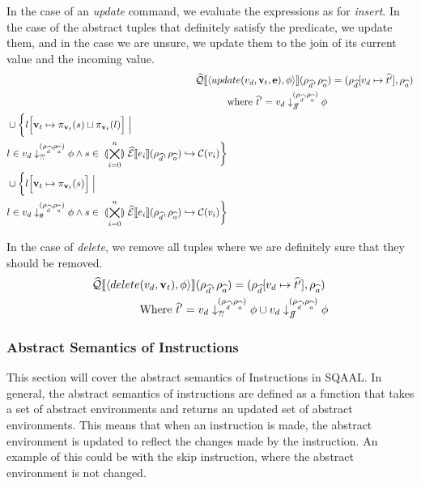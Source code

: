 In the case of an \textit{update} command, we evaluate the expressions as for \textit{insert}.
In the case of the abstract tuples that definitely satisfy the predicate, we update them, and in the case we are unsure, we update them to the join of its current value and the incoming value.
\begin{align}
    \widehat{\mathcal{Q}}\llbracket \langle upd&ate(v_d, \mathbf{v}_t, \mathbf{e}), \phi \rangle \rrbracket (\rho_{\widehat{d}}, \rho_{\widehat{a}}) = (\rho_{\widehat{d}}[v_d\mapsto \widehat{t'}], \rho_{\widehat{a}})\nonumber\\
    &\text{where }\widehat{t}' = v_d \downarrow_{f\!\!f}^{(\rho_{\widehat{d}}, \rho_{\widehat{a}})} \phi \nonumber\\
    \begin{split}
         &\cup \biggl\{ l\Bigl[ \mathbf{v}_t \mapsto \pi_{\mathbf{v}_t}(s) \sqcup \pi_{\mathbf{v}_t}(l) \Bigr] \;\Big|\;\\
         &l \in v_d \downarrow_{?\!?}^{(\rho_{\widehat{d}}, \rho_{\widehat{a}})} \phi \land s \in \;\llparenthesis\bigtimes_{i = 0}^{n}\rrparenthesis\; \widehat{\mathcal{E}}\llbracket e_i \rrbracket(\rho_{\widehat{d}}, \rho_{\widehat{a}}) \hookrightarrow \mathcal{C}(v_i)\biggr\} \nonumber
    \end{split} \\
    \begin{split}
        &\cup \biggl\{ l\Bigl[ \mathbf{v}_t \mapsto \pi_{\mathbf{v}_t}(s) \Bigr] \;\Big|\;\\
        &l \in v_d \downarrow_{t\!t}^{(\rho_{\widehat{d}}, \rho_{\widehat{a}})} \phi \land s \in \;\llparenthesis\bigtimes_{i = 0}^{n}\rrparenthesis\; \widehat{\mathcal{E}}\llbracket e_i \rrbracket(\rho_{\widehat{d}}, \rho_{\widehat{a}}) \hookrightarrow \mathcal{C}(v_i)\biggr\}
    \end{split}
\end{align}

In the case of \textit{delete}, we remove all tuples where we are definitely sure that they should be removed.
\begin{align}
    \widehat{\mathcal{Q}}\llbracket \langle delete&(v_d, \mathbf{v}_t), \phi \rangle \rrbracket (\rho_{\widehat{d}}, \rho_{\widehat{a}}) = (\rho_{\widehat{d}}[v_d\mapsto \widehat{t'}], \rho_{\widehat{a}}) \nonumber\\
    &\text{Where }\widehat{t}' = v_d \downarrow_{?\!?}^{(\rho_{\widehat{d}}, \rho_{\widehat{a}})} \phi \cup v_d \downarrow_{f\!\!f}^{(\rho_{\widehat{d}}, \rho_{\widehat{a}})} \phi
\end{align}

\subsubsection{Abstract Semantics of Instructions}
This section will cover the abstract semantics of Instructions in SQAAL.
In general, the abstract semantics of instructions are defined as a function that takes a set of abstract environments and returns an updated set of abstract environments.
This means that when an instruction is made, the abstract environment is updated to reflect the changes made by the instruction.
An example of this could be with the skip instruction, where the abstract environment is not changed.


